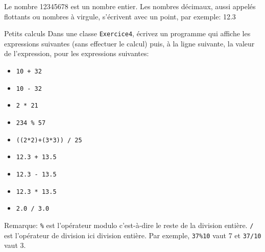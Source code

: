 \documentclass[a4paper,11pt]{article}
\begin{document}
	Le nombre 12345678 est un nombre entier. Les nombres décimaux, aussi appelés flottants ou nombres à virgule, s'écrivent avec un point, par exemple: 12.3


	\begin{Exercice}{Petits calculs}
		Dans une classe \texttt{Exercice4}, écrivez un programme qui affiche les expressions suivantes (sans effectuer le calcul) puis, à la ligne suivante,
		la valeur de l'expression, pour les expressions	suivantes:
		\begin{itemize}
			\item \texttt{10 + 32}
			\item \texttt{10 - 32}
			\item \texttt{2 * 21}
			\item \texttt{234 \% 57}
			\item \texttt{((2*2)+(3*3)) / 25}	
			\item \texttt{12.3 + 13.5}
			\item \texttt{12.3 - 13.5}
			\item \texttt{12.3 * 13.5}
			\item \texttt{2.0 / 3.0}
		\end{itemize}
		
		Remarque: \texttt{\%} est l'opérateur modulo c'est-à-dire le reste de la division entière. 
			\texttt{/} est l'opérateur de division ici division entière. Par exemple,
		\texttt{37\%10} vaut 7 et \texttt{37/10} vaut 3.   
		
	\end{Exercice}
	
\end{document}
